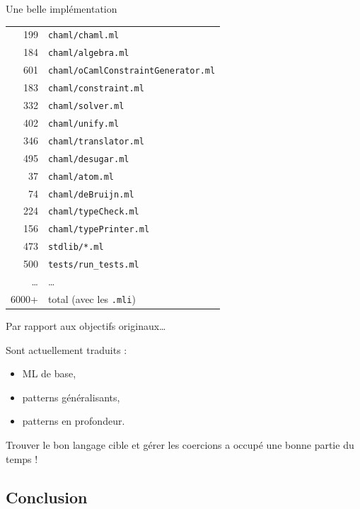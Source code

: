 \documentclass[final]{beamer}
\begin{document}
\begin{frame}{Une belle implémentation}

  \footnotesize

  \begin{tabular}{rl}
    199 & \texttt{chaml/chaml.ml} \\
    184 & \texttt{chaml/algebra.ml} \\
    601 & \texttt{chaml/oCamlConstraintGenerator.ml} \\
    183 & \texttt{chaml/constraint.ml} \\
    332 & \texttt{chaml/solver.ml} \\
    402 & \texttt{chaml/unify.ml} \\
    346 & \texttt{chaml/translator.ml} \\
    495 & \texttt{chaml/desugar.ml} \\
    37 & \texttt{chaml/atom.ml} \\
    74 & \texttt{chaml/deBruijn.ml} \\
    224 & \texttt{chaml/typeCheck.ml} \\
    156 & \texttt{chaml/typePrinter.ml} \\
    473 & \texttt{stdlib/*.ml} \\
    500 & \texttt{tests/run\_tests.ml} \\
    \dots & \dots \\
  6000+ & total (avec les \texttt{.mli})
  \end{tabular}

\end{frame}

\begin{frame}{Par rapport aux objectifs originaux\dots}

  Sont actuellement traduits :
  \begin{itemize}
    \item ML de base,
    \item patterns généralisants,
    \item patterns en profondeur.
  \end{itemize}

  Trouver le bon langage cible et gérer les coercions a occupé une bonne partie
  du temps !

\end{frame}

\subsection{Conclusion}
\end{document}
